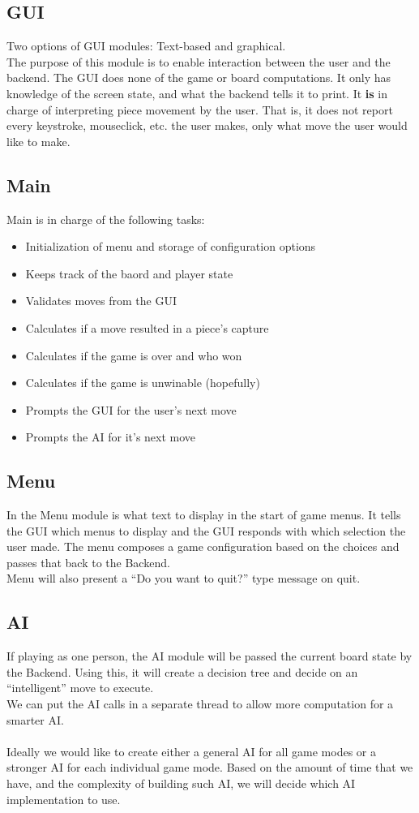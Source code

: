 \documentclass[11pt, oneside]{article}
\begin{document}
\subsection{GUI}
Two options of GUI modules: Text-based and graphical.\\
The purpose of this module is to enable interaction between the user and the
backend. The GUI does none of the game or board computations. It only has
knowledge of the screen state, and what the backend tells it to print. It
\textbf{is} in charge of interpreting piece movement by the user. That is, it
does not report every keystroke, mouseclick, etc. the user makes, only what move
the user would like to make.

\subsection{Main}
Main is in charge of the following tasks:
\begin{itemize}
\item Initialization of menu and storage of configuration options
\item Keeps track of the baord and player state
\item Validates moves from the GUI
\item Calculates if a move resulted in a piece's capture
\item Calculates if the game is over and who won
\item Calculates if the game is unwinable (hopefully)
\item Prompts the GUI for the user's next move
\item Prompts the AI for it's next move
\end{itemize}

\subsection{Menu}
In the Menu module is what text to display in the start of game menus. It tells
the GUI which menus to display and the GUI responds with which selection the
user made. The menu composes a game configuration based on the choices and
passes that back to the Backend.\\
Menu will also present a ``Do you want to quit?'' type message on quit.

\subsection{AI}
If playing as one person, the AI module will be passed the current board state
by the Backend. Using this, it will create a decision tree and decide on an
``intelligent'' move
to execute.\\
We can put the AI calls in a separate thread to allow more computation for a
smarter AI.\\\\
Ideally we would like to create either a general AI for all game modes or a
stronger AI for each individual game mode. Based on the amount of time that we
have, and the complexity of building such AI, we will decide which AI
implementation to use.
\end{document}
